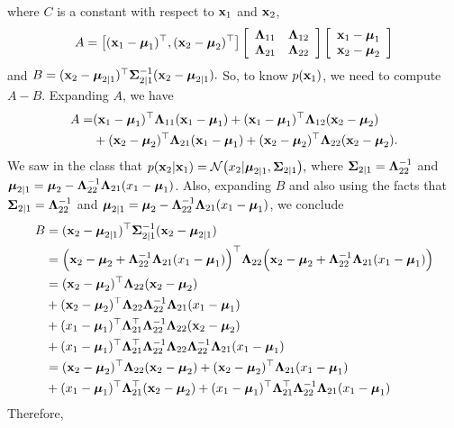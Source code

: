 \documentclass[12pt, fullpage,letterpaper]{article}
\begin{document}
\begin{enumerate}
{where $C$ is a constant with respect to $\x_1$ and $\x_2$, 
 $$A = \left[(\x_1-\bmu_1)^\top,(\x_2-\bmu_2)^\top\right] \left[\begin{array}{cc} \bLambda_{11} & \bLambda_{12} \\  \bLambda_{21} & \bLambda_{22}\end{array}\right]
\left[\begin{array}{c}\x_1-\bmu_1 \\  \x_2 -\bmu_2 \end{array}\right]$$
and 
$B = (\x_2-\bmu_{2|1})^\top\bSigma_{2|1}^{-1}(\x_2-\bmu_{2|1}).$
So, to know $p(\x_1)$, we need to compute $A-B$. Expanding $A$, we have 
\begin{align*}
A = & (\x_1-\bmu_1)^\top \bLambda_{11}(\x_1-\bmu_1) + (\x_1-\bmu_1)^\top \bLambda_{12}(\x_2 -\bmu_2) \\
& + (\x_2-\bmu_2)^\top \bLambda_{21}(\x_1-\bmu_1) + (\x_2-\bmu_2)^\top \bLambda_{22}(\x_2 -\bmu_2).
\end{align*}
We saw in the class that 
$p(\x_2|\x_1) = \N\big(x_2|\bmu_{2|1},\bSigma_{2|1}\big),$
where $\bSigma_{2|1} = \bLambda^{-1}_{22}$ and $\bmu_{2|1}=\bmu_2 - \bLambda_{22}^{-1}\bLambda_{21}(x_1-\bmu_1)$.
Also, expanding $B$ and also using the facts that $\bSigma_{2|1} = \bLambda^{-1}_{22}$ and $\bmu_{2|1}=\bmu_2 - \bLambda_{22}^{-1}\bLambda_{21}(x_1-\bmu_1)$, we conclude 
\begin{align*}
B & = (\x_2-\bmu_{2|1})^\top\bSigma_{2|1}^{-1}(\x_2-\bmu_{2|1})\\
& = \Big(\x_2-\bmu_2 + \bLambda_{22}^{-1}\bLambda_{21}(x_1-\bmu_1)\Big)^\top \bLambda_{22}\Big(\x_2-\bmu_2 + \bLambda_{22}^{-1}\bLambda_{21}(x_1-\bmu_1)\Big)\\ 
& = (\x_2-\bmu_2)^\top\bLambda_{22}(\x_2-\bmu_2) \\ 
& + (\x_2-\bmu_2)^\top\bLambda_{22}\bLambda_{22}^{-1}\bLambda_{21}(x_1-\bmu_1)\\
& + (x_1-\bmu_1)^\top\bLambda_{21}^\top\bLambda_{22}^{-1}\bLambda_{22}(\x_2-\bmu_2) \\
& + (x_1-\bmu_1)^\top\bLambda_{21}^\top\bLambda_{22}^{-1} \bLambda_{22}\bLambda_{22}^{-1}\bLambda_{21}(x_1-\bmu_1)\\
& = (\x_2-\bmu_2)^\top\bLambda_{22}(\x_2-\bmu_2) + (\x_2-\bmu_2)^\top\bLambda_{21}(x_1-\bmu_1)\\
& + (x_1-\bmu_1)^\top\bLambda_{21}^\top(\x_2-\bmu_2) + (x_1-\bmu_1)^\top\bLambda_{21}^\top\bLambda_{22}^{-1}\bLambda_{21}(x_1-\bmu_1)
\end{align*}
Therefore, 
\begin{align*}

\end{align*}}
\end{enumerate}
\end{document}
